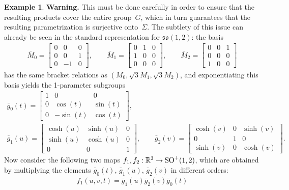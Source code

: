 \documentclass[pdftex]{sigma}
\numberwithin{equation}{section}
\theoremstyle{definition}
\newtheorem{exmpl}[teo]{Example}
\begin{document}
\begin{exmpl}
{\bf Warning.} This must be done carefully in order to ensure that the resulting products cover the entire group~$G$,
which in turn guarantees that the resulting parametrization is surjective onto~$\Sigma$.
The subtlety of this issue can already be seen in the standard representation for $\mathfrak{so}(1,2)$: the basis
\begin{gather*}
\bar{M}_0 =
\begin{bmatrix}
0 & 0 & 0
\\
0 & 0 & 1
\\
0 & -1 & 0
\end{bmatrix},
\qquad
\bar{M}_1 =
\begin{bmatrix}
0 & 1 & 0
\\
1 & 0 & 0
\\
0 & 0 & 0
\end{bmatrix},
\qquad
\bar{M}_2 =
\begin{bmatrix}
0 & 0 & 1
\\
0 & 0 & 0
\\
1 & 0 & 0
\end{bmatrix}
\end{gather*}
has the same bracket relations as $(M_0, \sqrt{3}M_1, \sqrt{3}M_2)$, and exponentiating this basis yields the
1-parameter subgroups
\begin{gather*}
\bar{g}_0(t) =
\begin{bmatrix}
1 & 0 & 0
\\
0 & \cos(t) & \sin(t)
\\
0 & -\sin(t) & \cos(t)
\end{bmatrix},
\\
\bar{g}_1(u) =
\begin{bmatrix}
\cosh (u) & \sinh (u) & 0
\\
\sinh (u) & \cosh (u) & 0
\\
0 & 0 & 1
\end{bmatrix},
\qquad
\bar{g}_2(v) =
\begin{bmatrix}
\cosh (v) & 0 & \sinh (v)
\\
0 & 1 & 0
\\
\sinh (v) & 0 & \cosh (v)
\end{bmatrix}.
\end{gather*}
Now consider the following two maps $f_1, f_2:\mathbb{R}^3 \to {\rm SO}^+(1,2)$, which are obtained by multiplying the
elements $\bar{g}_0(t)$, $\bar{g}_1(u)$, $\bar{g}_2(v)$ in dif\/ferent orders:
\begin{gather*}
f_1(u,v,t) = \bar{g}_1(u) \bar{g}_2(v) \bar{g}_0(t)
\\

\end{gather*}
\end{exmpl}
\end{document}
